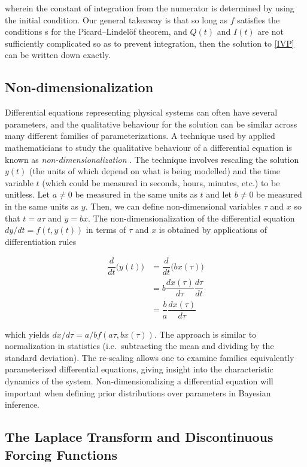 \noindent wherein the constant of integration from the numerator is determined by using the initial condition. Our general takeaway is that so long as $f$ satisfies the conditions s for the Picard–Lindelöf theorem, and $Q(t)$ and $I(t)$ are not sufficiently complicated so as to prevent integration, then the solution to \cref{IVP} can be written down exactly.


\subsection{Non-dimensionalization}

Differential equations representing physical systems can often have several parameters, and the qualitative behaviour for the solution can be similar across many different families of parameterizations. A technique used by applied mathematicians to study the qualitative behaviour of a differential equation is known as \textit{non-dimensionalization} \cite[p.~25]{holmes2009introduction}.  The technique involves rescaling the solution $y(t)$ (the units of which depend on what is being modelled) and the time variable $t$ (which could be measured in seconds, hours, minutes, etc.) to be unitless. Let $a \neq 0$ be measured in the same units as $t$ and let $b \neq 0$ be measured in the same units as $y$.  Then, we can define non-dimensional variables $\tau$ and $x$ so that $t = a \tau $ and $y = b x$.  The non-dimensionalization of the differential equation $dy/dt = f(t, y(t))$  in terms of $\tau$ and $x$ is obtained by applications of differentiation rules

\begin{align}
	\dfrac{d }{dt} \Big( y(t) \Big) &=  	\dfrac{d }{dt} \Big( b x(\tau) \Big)\\
													&= b \dfrac{dx(\tau) }{d\tau} \dfrac{d \tau}{dt}\\
													&= \dfrac{b}{a} \dfrac{dx(\tau)}{d\tau}
\end{align}


\noindent which yields $dx / d \tau = a/b f(a\tau, bx(\tau))$.  The approach is similar to normalization in statistics (i.e.\ subtracting the mean and dividing by the standard deviation).  The re-scaling allows one to examine families equivalently parameterized differential equations, giving insight into the characteristic dynamics of the system. Non-dimensionalizing a differential equation will important when defining prior distributions over parameters in Bayesian inference.

\subsection{The Laplace Transform and Discontinuous Forcing Functions}

